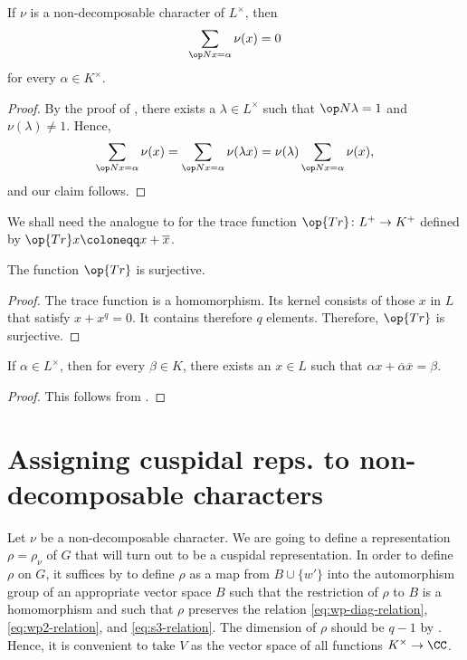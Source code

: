 \documentclass[../main.tex]{subfiles}
\begin{document}
\begin{lemma} \label{lem:sum-over-equal-norm}
	If $\nu$ is a non-decomposable character of $L^\times$, then
	\[\sum_{\op Nx=\alpha}\nu(x)=0\]
	for every $\alpha\in K^\times$.
\end{lemma}
\begin{proof}
	By the proof of , there exists a $\lambda\in L^\times$ such that $\op N\lambda=1$ and $\nu(\lambda)\ne1$. Hence,
	\[\sum_{\op Nx=\alpha}\nu(x)=\sum_{\op Nx=\alpha}\nu(\lambda x)=\nu(\lambda)\sum_{\op Nx=\alpha}\nu(x),\]
	and our claim follows.
\end{proof}

We shall need the analogue to  for the trace function $\op{Tr}\colon L^+\to K^+$ defined by $\op{Tr}x\coloneqq x+\overline x$.
\begin{lemma} \label{lem:tr-epi}
	The function $\op{Tr}$ is surjective.
\end{lemma}
\begin{proof}
	The trace function is a homomorphism. Its kernel consists of those $x$ in $L$ that satisfy $x+x^q=0$. It contains therefore $q$ elements. Therefore, $\op{Tr}$ is surjective.
\end{proof}
\begin{corollary} \label{cor:use-tr-epi}
	If $\alpha\in L^\times$, then for every $\beta\in K$, there exists an $x\in L$ such that $\alpha x+\overline\alpha\overline x=\beta$.
\end{corollary}
\begin{proof}
	This follows from .
\end{proof}

\section{Assigning cuspidal reps. to non-decomposable characters}
Let $\nu$ be a non-decomposable character. We are going to define a representation $\rho=\rho_\nu$ of $G$ that will turn out to be a cuspidal representation. In order to define $\rho$ on $G$, it suffices by  to define $\rho$ as a map from $B\cup\{w'\}$ into the automorphism group of an appropriate vector space $B$ such that the restriction of $\rho$ to $B$ is a homomorphism and such that $\rho$ preserves the relation \eqref{eq:wp-diag-relation}, \eqref{eq:wp2-relation}, and \eqref{eq:s3-relation}. The dimension of $\rho$ should be $q-1$ by . Hence, it is convenient to take $V$ as the vector space of all functions $K^\times\to\CC$.
\end{document}

